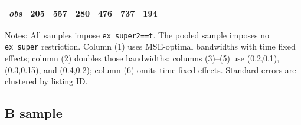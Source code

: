 \begin{table}[!htbp]
\begin{tabular}{lcccccc}
\textit{obs} & 205 & 557 & 280 & 476 & 737 & 194 \\
\bottomrule
\end{tabular}
\begin{minipage}{0.98\textwidth}\footnotesize
Notes: All samples impose \texttt{ex\_super2==t}. The pooled sample imposes no \texttt{ex\_super} restriction. Column (1) uses MSE-optimal bandwidths with time fixed effects; column (2) doubles those bandwidths; columns (3)--(5) use (0.2,0.1), (0.3,0.15), and (0.4,0.2); column (6) omits time fixed effects. Standard errors are clustered by listing ID.
\end{minipage}
\end{table}

\subsection{B sample}
